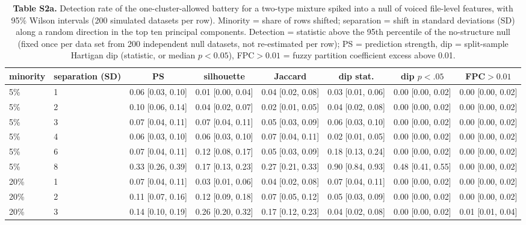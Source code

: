 \begin{table}[htbp]\centering\scriptsize
\caption{\textbf{Table S2a.} Detection rate of the one-cluster-allowed battery for a two-type mixture spiked into a null of voiced file-level features, with 95\% Wilson intervals (200 simulated datasets per row). Minority = share of rows shifted; separation = shift in standard deviations (SD) along a random direction in the top ten principal components. Detection = statistic above the 95th percentile of the no-structure null (fixed once per data set from 200 independent null datasets, not re-estimated per row); PS = prediction strength, dip = split-sample Hartigan dip (statistic, or median $p<0.05$), FPC$>0.01$ = fuzzy partition coefficient excess above 0.01.}\label{tab:S2a}
\begin{adjustbox}{max width=\linewidth}
\begin{tabular}{llcccccc}
\toprule
minority & separation (SD) & PS & silhouette & Jaccard & dip stat. & dip $p<.05$ & FPC$>0.01$ \\
\midrule
5\% & 1 & 0.06 [0.03, 0.10] & 0.01 [0.00, 0.04] & 0.04 [0.02, 0.08] & 0.03 [0.01, 0.06] & 0.00 [0.00, 0.02] & 0.00 [0.00, 0.02] \\
5\% & 2 & 0.10 [0.06, 0.14] & 0.04 [0.02, 0.07] & 0.02 [0.01, 0.05] & 0.04 [0.02, 0.08] & 0.00 [0.00, 0.02] & 0.00 [0.00, 0.02] \\
5\% & 3 & 0.07 [0.04, 0.11] & 0.07 [0.04, 0.11] & 0.05 [0.03, 0.09] & 0.06 [0.03, 0.10] & 0.00 [0.00, 0.02] & 0.00 [0.00, 0.02] \\
5\% & 4 & 0.06 [0.03, 0.10] & 0.06 [0.03, 0.10] & 0.07 [0.04, 0.11] & 0.02 [0.01, 0.05] & 0.00 [0.00, 0.02] & 0.00 [0.00, 0.02] \\
5\% & 6 & 0.07 [0.04, 0.11] & 0.12 [0.08, 0.17] & 0.05 [0.03, 0.09] & 0.18 [0.13, 0.24] & 0.00 [0.00, 0.02] & 0.00 [0.00, 0.02] \\
5\% & 8 & 0.33 [0.26, 0.39] & 0.17 [0.13, 0.23] & 0.27 [0.21, 0.33] & 0.90 [0.84, 0.93] & 0.48 [0.41, 0.55] & 0.00 [0.00, 0.02] \\
20\% & 1 & 0.07 [0.04, 0.11] & 0.03 [0.01, 0.06] & 0.04 [0.02, 0.08] & 0.07 [0.04, 0.11] & 0.00 [0.00, 0.02] & 0.00 [0.00, 0.02] \\
20\% & 2 & 0.11 [0.07, 0.16] & 0.12 [0.09, 0.18] & 0.07 [0.05, 0.12] & 0.05 [0.03, 0.09] & 0.00 [0.00, 0.02] & 0.00 [0.00, 0.02] \\
20\% & 3 & 0.14 [0.10, 0.19] & 0.26 [0.20, 0.32] & 0.17 [0.12, 0.23] & 0.04 [0.02, 0.08] & 0.00 [0.00, 0.02] & 0.01 [0.01, 0.04] \\

\end{tabular}
\end{adjustbox}
\end{table}
